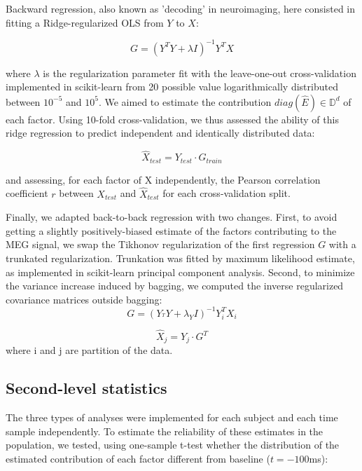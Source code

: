Backward regression, also known as 'decoding' in neuroimaging, here consisted in fitting a Ridge-regularized OLS from $Y$ to $X$:

\begin{equation}
G = (Y^{T}Y+\lambda I)^{-1} Y^{T}X
\end{equation}

where $\lambda$ is the regularization parameter fit with the leave-one-out cross-validation
implemented in scikit-learn \cite{sklearn} from 20 possible value logarithmically distributed
between $10^{-5}$ and $10^5$. We aimed to estimate the contribution $diag(\hat E)
\in\mathbb{D}^{d} $ of each factor. Using 10-fold cross-validation, we thus assessed the ability
of this ridge regression to predict independent and identically distributed data:

\begin{equation}
\hat X_{test} = Y_{test}\cdot G_{train}
\end{equation}

and assessing, for each factor of X independently, the Pearson correlation coefficient $r$ between $X_{test}$ and $\hat X_{test}$ for each cross-validation split.

Finally, we adapted back-to-back regression with two changes. First, to avoid getting a slightly positively-biased estimate of the factors contributing to the MEG signal, we swap the Tikhonov regularization of the first regression $G$ with a trunkated regularization. Trunkation was fitted by maximum likelihood estimate, as implemented in scikit-learn principal component analysis. Second, to minimize the variance increase induced by bagging, we computed the inverse regularized covariance matrices outside bagging:
\begin{equation}
G = (Y_^T Y+\lambda_Y I)^{-1} Y_i^T X_i
\end{equation}

\begin{equation}
\hat X_j = Y_j \cdot G^T
\end{equation}
where i and j are partition of the data.


\subsection{Second-level statistics}

The three types of analyses were implemented for each subject and each time sample independently.
To estimate the reliability of these estimates in the population, we tested, using one-sample t-test whether the distribution of the estimated contribution of each factor different from baseline ($t=-100$ms):

